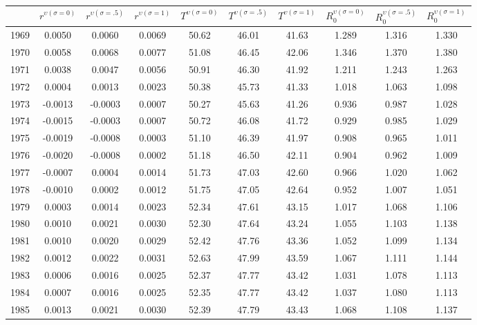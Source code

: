 \begin{tabular}{cccccccccc}
  \hline
 & $r^{\upsilon (\sigma = 0)}$ & $r^{\upsilon (\sigma = .5)}$ & $r^{\upsilon (\sigma = 1)}$ & $T^{\upsilon (\sigma = 0)}$ & $T^{\upsilon (\sigma = .5)}$ & $T^{\upsilon (\sigma = 1)}$ & $R_0^{\upsilon (\sigma = 0)}$ & $R_0^{\upsilon (\sigma = .5)}$ & $R_0^{\upsilon (\sigma = 1)}$ \\ 
  \hline
1969 & 0.0050 & 0.0060 & 0.0069 & 50.62 & 46.01 & 41.63 & 1.289 & 1.316 & 1.330 \\ 
  1970 & 0.0058 & 0.0068 & 0.0077 & 51.08 & 46.45 & 42.06 & 1.346 & 1.370 & 1.380 \\ 
  1971 & 0.0038 & 0.0047 & 0.0056 & 50.91 & 46.30 & 41.92 & 1.211 & 1.243 & 1.263 \\ 
  1972 & 0.0004 & 0.0013 & 0.0023 & 50.38 & 45.73 & 41.33 & 1.018 & 1.063 & 1.098 \\ 
  1973 & -0.0013 & -0.0003 & 0.0007 & 50.27 & 45.63 & 41.26 & 0.936 & 0.987 & 1.028 \\ 
  1974 & -0.0015 & -0.0003 & 0.0007 & 50.72 & 46.08 & 41.72 & 0.929 & 0.985 & 1.029 \\ 
  1975 & -0.0019 & -0.0008 & 0.0003 & 51.10 & 46.39 & 41.97 & 0.908 & 0.965 & 1.011 \\ 
  1976 & -0.0020 & -0.0008 & 0.0002 & 51.18 & 46.50 & 42.11 & 0.904 & 0.962 & 1.009 \\ 
  1977 & -0.0007 & 0.0004 & 0.0014 & 51.73 & 47.03 & 42.60 & 0.966 & 1.020 & 1.062 \\ 
  1978 & -0.0010 & 0.0002 & 0.0012 & 51.75 & 47.05 & 42.64 & 0.952 & 1.007 & 1.051 \\ 
  1979 & 0.0003 & 0.0014 & 0.0023 & 52.34 & 47.61 & 43.15 & 1.017 & 1.068 & 1.106 \\ 
  1980 & 0.0010 & 0.0021 & 0.0030 & 52.30 & 47.64 & 43.24 & 1.055 & 1.103 & 1.138 \\ 
  1981 & 0.0010 & 0.0020 & 0.0029 & 52.42 & 47.76 & 43.36 & 1.052 & 1.099 & 1.134 \\ 
  1982 & 0.0012 & 0.0022 & 0.0031 & 52.63 & 47.99 & 43.59 & 1.067 & 1.111 & 1.144 \\ 
  1983 & 0.0006 & 0.0016 & 0.0025 & 52.37 & 47.77 & 43.42 & 1.031 & 1.078 & 1.113 \\ 
  1984 & 0.0007 & 0.0016 & 0.0025 & 52.35 & 47.77 & 43.42 & 1.037 & 1.080 & 1.113 \\ 
  1985 & 0.0013 & 0.0021 & 0.0030 & 52.39 & 47.79 & 43.43 & 1.068 & 1.108 & 1.137 \\ 

\end{tabular}
